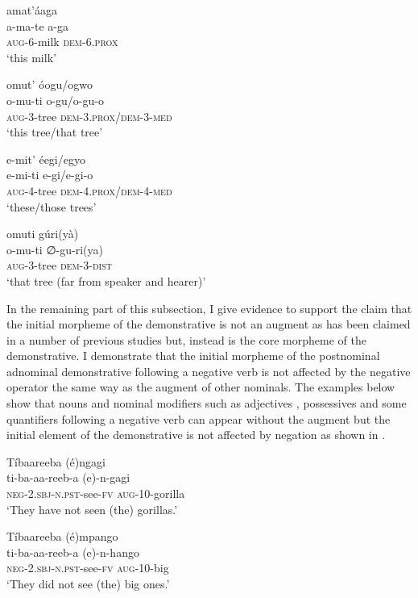 \documentclass[output=paper 		  ]{langscibook}
\begin{document}
\ea%
    \label{ex:asiimwe:5}
    \ea\label{ex:asiimwe:5a} amat’áaga\\
     \gll a-ma-te  a-ga\\
     \textsc{aug}{}-6-milk  \textsc{dem-6.prox}\\
     \glt ‘this milk’

    \ex\label{ex:asiimwe:5b}  omut’ óogu/ogwo\\
    \gll o-mu-ti    o-gu/o-gu-o\\
      \textsc{aug}{}-3-tree  \textsc{dem-3.prox/dem-3-med}\\
    \glt  ‘this tree/that tree’

    \ex\label{ex:asiimwe:5c}  e-mit’ éegi/egyo\\
    \gll e-mi-ti  e-gi/e-gi-o\\
    \textsc{aug}{}-4-tree  \textsc{dem-4.prox/dem-4-med}\\
    \glt  ‘these/those trees’

    \ex\label{ex:asiimwe:5d}  omuti gúri(yà)\\
    \gll o-mu-ti  ∅-gu-ri(ya)\\
      \textsc{aug}{}-3-tree  \textsc{dem-3-dist}\\
    \glt    ‘that tree (far from speaker and hearer)’
  \z
\z

In the remaining part of this subsection, I give evidence to support the claim that the initial morpheme of the demonstrative is not an augment as has been claimed in a number of previous studies but, instead  is the core morpheme of the demonstrative. I demonstrate that the initial morpheme of the postnominal adnominal demonstrative following a negative verb is not affected by the negative operator the same way as the augment of other nominals. The examples below show that nouns  and nominal modifiers such as adjectives , possessives  and some quantifiers  following a negative verb can appear without the augment but the initial element of the demonstrative is not affected by negation as shown in .

\ea%
    \label{ex:asiimwe:6}
    \ea\label{ex:asiimwe:6a}  Tíbaareeba (é)ngagi\\
  \gll ti-ba-aa-reeb-a  (e)-n-gagi\\
  \textsc{neg-2.sbj-n.pst}{}-see-\textsc{fv}  \textsc{aug}{}-10-gorilla\\
  \glt ‘They have not seen (the) gorillas.’

    \ex\label{ex:asiimwe:6b}  Tíbaareeba (é)mpango\\
 \gll ti-ba-aa-reeb-a  (e)-n-hango \\
  \textsc{neg-2.sbj-n.pst}{}-see-\textsc{fv}  \textsc{aug}{}-10-big\\
  \glt `They did not see (the) big ones.’
\end{document}
